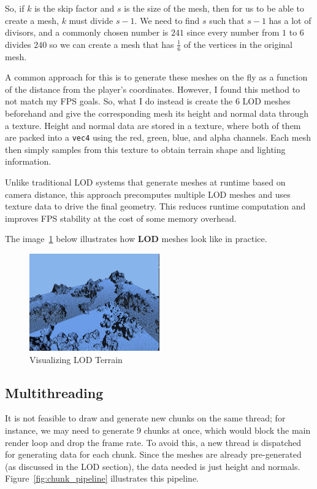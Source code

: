 So, if $k$ is the skip factor and $s$ is the size of the mesh, then for us to be able to create a mesh, $k$ must divide $s-1$. We need to find $s$ such that $s-1$ has a lot of divisors, and a commonly chosen number is \textbf{$241$} since every number from $1$ to $6$ divides $240$ so we can create a mesh that has $\frac{1}{6}$ of the vertices in the original mesh.

A common approach for this is to generate these meshes on the fly as a function of the distance from the player's coordinates. However, I found this method to not match my FPS goals. So, what I do instead is create the 6 LOD meshes beforehand and give the corresponding mesh its height and normal data through a texture. Height and normal data are stored in a texture, where both of them are packed into a \texttt{vec4} using the red, green, blue, and alpha channels. Each mesh then simply samples from this texture to obtain terrain shape and lighting information.

Unlike traditional LOD systems that generate meshes at runtime based on camera distance, this approach precomputes multiple LOD meshes and uses texture data to drive the final geometry. This reduces runtime computation and improves FPS stability at the cost of some memory overhead.

The image~\ref{fig:lod_terrain} below illustrates how \textbf{LOD} meshes look like in practice.

\begin{figure}[H]
    \centering
    \includegraphics[width=0.5\textwidth]{images/LOD.png}
    \caption{Visualizing LOD Terrain}
    \label{fig:lod_terrain}
\end{figure}

\subsection{Multithreading}
It is not feasible to draw and generate new chunks on the same thread; for instance, we may need to generate 9 chunks at once, which would block the main render loop and drop the frame rate. To avoid this, a new thread is dispatched for generating data for each chunk. Since the meshes are already pre-generated (as discussed in the LOD section), the data needed is just height and normals.
Figure~\ref{fig:chunk_pipeline} illustrates this pipeline.

